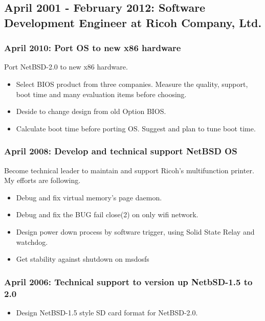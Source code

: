 \documentclass[letterpaper]{article}
\begin{document}
\subsection*{April 2001 - February 2012: Software Development Engineer at Ricoh Company, Ltd.}
\subsubsection*{April 2010: Port OS to new x86 hardware}
Port NetBSD-2.0 to new x86 hardware.

\begin{itemize}
  \item Select BIOS product from three companies. Measure the quality, support, boot time and many evaluation items before choosing.
  \item Deside to change design from old Option BIOS.
  \item Calculate boot time before porting OS. Suggest and plan to tune boot time.
\end{itemize}

\subsubsection*{April 2008: Develop and technical support NetBSD OS}
Become technical leader to maintain and support Ricoh's multifunction printer.
My efforts are following.
\begin{itemize}
  \item Debug and fix virtual memory's page daemon.
  \item Debug and fix the BUG fail close(2) on only wifi network.
  \item Design power down process by software trigger, using Solid State Relay and watchdog.
  \item Get stability against shutdown on msdosfs
\end{itemize}

\subsubsection*{April 2006: Technical support to version up NetbSD-1.5 to 2.0}

\begin{itemize}
  \item Design NetBSD-1.5 style SD card format for NetBSD-2.0.
\end{itemize}
\end{document}
